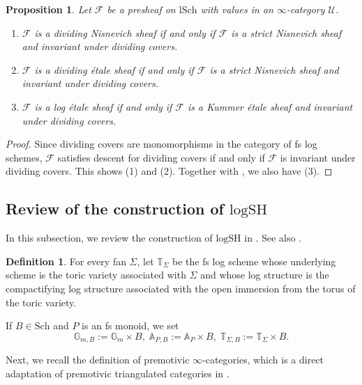 \documentclass[10pt]{amsart}
\newtheorem{prop}[thm]{Proposition}
\theoremstyle{definition}
\newtheorem{df}[thm]{Definition}
\theoremstyle{remark}
\numberwithin{equation}{subsection}
\newcommand{\A}{\mathbb{A}}
\newcommand{\G}{\mathbb{G}}
\newcommand{\T}{\mathbb{T}}
\newcommand{\cF}{\mathcal{F}}
\newcommand{\cU}{\mathcal{U}}
\newcommand{\logSH}{\mathrm{logSH}}
\newcommand{\Sch}{\mathrm{Sch}}
\newcommand{\lSch}{\mathrm{lSch}}
\begin{document}
\begin{prop}
\label{divlocal.8}
Let $\cF$ be a presheaf on $\lSch$ with values in an $\infty$-category $\cU$.
\begin{enumerate}
\item[\textup{(1)}]
$\cF$ is a dividing Nisnevich sheaf if and only if $\cF$ is a strict Nisnevich sheaf and invariant under dividing covers.
\item[\textup{(2)}]
$\cF$ is a dividing \'etale sheaf if and only if $\cF$ is a strict Nisnevich sheaf and invariant under dividing covers.
\item[\textup{(3)}]
$\cF$ is a log \'etale sheaf if and only if $\cF$ is a Kummer \'etale sheaf and invariant under dividing covers.
\end{enumerate}
\end{prop}
\begin{proof}
Since dividing covers are monomorphisms in the category of fs log schemes, $\cF$ satisfies descent for dividing covers if and only if $\cF$ is invariant under dividing covers.
This shows (1) and (2).
Together with \cite[Proposition 3.9]{Nak2},
we also have (3).
\end{proof}



\subsection{Review of the construction of \texorpdfstring{$\logSH$}{logSH}}
\label{review}


In this subsection, we review the construction of $\logSH$ in \cite{logSH}.
See also \cite{logDMCras}.




\begin{df}
For every fan $\Sigma$, let $\T_\Sigma$ be the fs log scheme whose underlying scheme is the toric variety associated with $\Sigma$ and whose log structure is the compactifying log structure associated with the open immersion from the torus of the toric variety.

If $B\in \Sch$ and $P$ is an fs monoid, we set
\[
\G_{m,B}:=\G_m\times B,
\;
\A_{P,B}:=\A_P\times B,
\;
\T_{\Sigma,B}:=\T_{\Sigma}\times B.
\]
\end{df}


Next, we recall the definition of premotivic $\infty$-categories, which is a direct adaptation of premotivic triangulated categories in \cite{CD19}.
\end{document}

